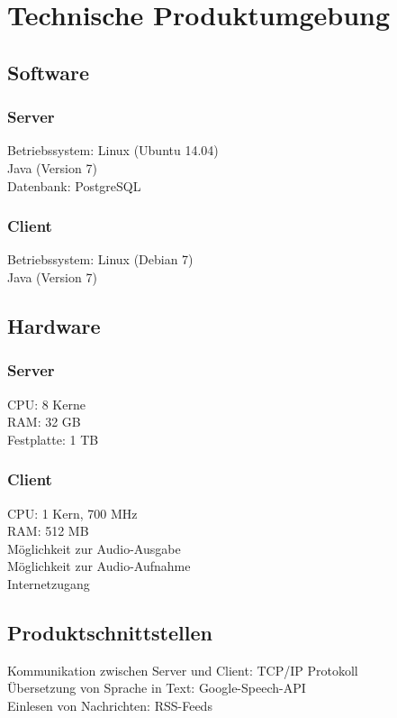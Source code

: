 

\chapter{Technische Produktumgebung}

\section{Software}

\subsection*{Server}
Betriebssystem: Linux (Ubuntu 14.04)\\
Java (Version 7)\\
Datenbank: PostgreSQL

\subsection*{Client}
Betriebssystem: Linux (Debian 7)\\
Java (Version 7)

\section{Hardware}

\subsection*{Server}
CPU: 8 Kerne\\
RAM: 32 GB\\
Festplatte: 1 TB

\subsection*{Client}
CPU: 1 Kern, 700 MHz\\
RAM: 512 MB\\
Möglichkeit zur Audio-Ausgabe\\
Möglichkeit zur Audio-Aufnahme\\
Internetzugang

\section{Produktschnittstellen}

Kommunikation zwischen Server und Client: TCP/IP Protokoll\\
Übersetzung von Sprache in Text: Google-Speech-API\\
Einlesen von Nachrichten: RSS-Feeds
